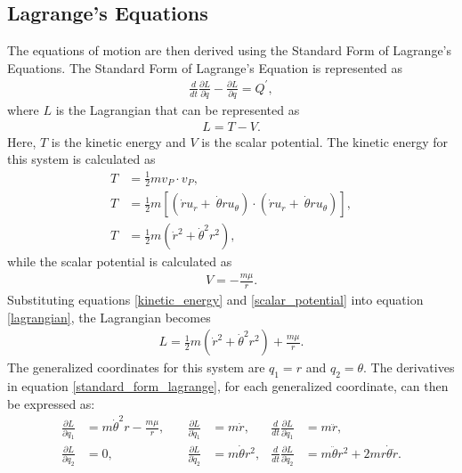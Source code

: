 \documentclass[]{article}
\begin{document}
\subsection{Lagrange's Equations}
The equations of motion are then derived using the Standard Form of Lagrange's Equations. The Standard Form of Lagrange's Equation is represented as
\begin{align}
	\frac{d}{dt}\frac{\partial L}{\partial \dot{q}} - \frac{\partial L}{\partial q} = Q^{'}, \label{standard_form_lagrange}
\end{align}
where \(L\) is the Lagrangian that can be represented as
\begin{align}
	L = T - V. \label{lagrangian}
\end{align}
Here, \(T\) is the kinetic energy and \(V\) is the scalar potential. The kinetic energy for this system is calculated as 
\begin{align}
	T &= \frac{1}{2}mv_{P} \cdot v_{P}, \nonumber\\
	T &= \frac{1}{2}m[(\dot{r}u_{r} +\ \dot{\theta}ru_{\theta}) \cdot (\dot{r}u_{r} +\ \dot{\theta}ru_{\theta})], \nonumber\\
	T &= \frac{1}{2}m(\dot{r}^2+\dot{\theta}^2r^2), \label{kinetic_energy}
\end{align}
while the scalar potential is calculated as
\begin{align}
	V = -\frac{m\mu}{r}. \label{scalar_potential}
\end{align}
Substituting equations \ref{kinetic_energy} and \ref{scalar_potential} into equation \ref{lagrangian}, the Lagrangian becomes
\begin{align}
	L = \frac{1}{2}m(\dot{r}^2+\dot{\theta}^2r^2) + \frac{m\mu}{r}. \label{lagrangian2}
\end{align}
 The generalized coordinates for this system are \(q_1 = r\) and \(q_2 = \theta\). The derivatives in equation \ref{standard_form_lagrange}, for each generalized coordinate, can then be expressed as:
\begin{align*}
  \frac{\partial L}{\partial q_{1}} &= m\dot{\theta}^2r - \frac{m\mu}{r},\quad & \frac{\partial L}{\partial \dot{q}_{1}} &= m\dot{r},          & \frac{d}{dt}\frac{\partial L}{\partial \dot{q}_{1}} &= m\ddot{r}, \\
  \frac{\partial L}{\partial q_{2}} &= 0,\quad                                 & \frac{\partial L}{\partial \dot{q}_{2}} &= m\dot{\theta}r^2,  & \frac{d}{dt}\frac{\partial L}{\partial \dot{q}_{2}} &= m\ddot{\theta}r^2 + 2mr\dot{\theta}\dot{r}.
\end{align*}
\end{document}
